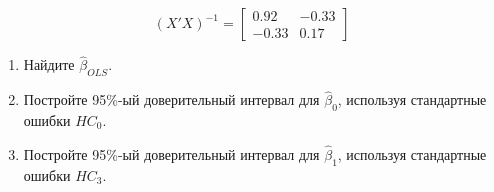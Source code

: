 \documentclass[10pt, a4paper]{extarticle}
\begin{document}
	\[
	(X'X)^{-1} = \begin{bmatrix}
		0.92 & -0.33 \\
		-0.33 & 0.17
	\end{bmatrix}
	\]

	\begin{enumerate}[label = \alph*)]
		\item Найдите $\hat{\beta}_{OLS}$.		
		\item Постройте 95\%-ый доверительный интервал для $\hat{\beta}_0$, используя стандартные ошибки $HC_0$.
		\item Постройте 95\%-ый доверительный интервал для $\hat{\beta}_1$, используя стандартные ошибки $HC_3$.
	\end{enumerate}
	
\end{document}
